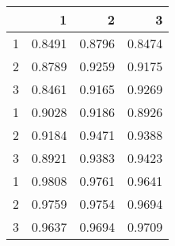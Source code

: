 \begin{tabular}{lrrr}
\toprule
{} &       1 &       2 &       3 \\
\midrule
1 &  0.8491 &  0.8796 &  0.8474 \\
2 &  0.8789 &  0.9259 &  0.9175 \\
3 &  0.8461 &  0.9165 &  0.9269 \\
1 &  0.9028 &  0.9186 &  0.8926 \\
2 &  0.9184 &  0.9471 &  0.9388 \\
3 &  0.8921 &  0.9383 &  0.9423 \\
1 &  0.9808 &  0.9761 &  0.9641 \\
2 &  0.9759 &  0.9754 &  0.9694 \\
3 &  0.9637 &  0.9694 &  0.9709 \\
\bottomrule
\end{tabular}
